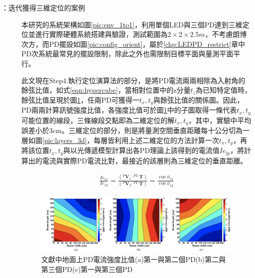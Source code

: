 \begin{description}




        \item[\cite{case:3d_layers}：迭代獲得三維定位的案例] \hfill 
        
        \qquad
        本研究的系統架構如圖\ref{pic:env_1to1}，利用單個LED與三個PD達到三維定位並進行實際硬體系統搭建與驗證，測試範圍為$2\times 2\times 2.5m$，不考慮朗博次方，而PD擺設如圖\ref{pic:config_orient}，屬於\ref{chp:LEDPD_restrict}章中PD次系統最常見的擺設限制，除此之外也需限制目標平面與量測平面平行。
        
        \qquad
        此文現在Step4.執行定位演算法的部分，是將PD電流兩兩相除為入射角的餘弦比值，如式\ref{eqn:hypercube}，當相對位置中的z分量$t_z$為已知特定值時，餘弦比值呈現於圖\ref{pic:layers_2d}，任兩PD可獲得一$t_x,t_y$與餘弦比值的關係圖。因此，PD兩兩計算訊號強度比值，各強度比值可於圖\ref{pic:layers_2d}中的子圖取得一條代表$t_x,t_y$可能位置的線段，三條線段交點即為二維定位的解$t_x,t_y$，其中，實驗中平均誤差小於3cm。三維定位的部分，則是將量測空間垂直距離每十公分切為一層如圖\ref{pic:layers_3d}，每層皆利用上述二維定位的方法計算一次$t_x,t_y$，再將該位置$t_x,t_y$與以光傳遞模型計算出各PD理論上該得到的電流值$Ie_{lp}$，將計算出的電流與實際PD電流比對，最接近的該層則為三維定位的垂直距離。

        \begin{equation}
            \label{eqn:hypercube}
            \begin{aligned}
                    \frac{Ie_{11}}{Ie_{12}}= 
                \frac{
                    ( ^{P}\boldsymbol{V}_1 \cdot 
                    ^{PL}\boldsymbol{T}
                    )
                } 
                    {
                        ( ^{P}\boldsymbol{V}_2 \cdot 
                                ^{PL}\boldsymbol{T}
                        )
                    }=\frac{\cos\phi_{11}}{\cos\phi_{12}}
            \end{aligned}
        \end{equation}

        \begin{figure}[htpb]
            \centering
            \includegraphics[width=15cm]{ch2pic/layers_2d.png}
            \caption{文獻\cite{case:3d_layers}中地面上PD電流強度比值(a)第一與第二個PD(b)第二與第三個PD(c)第一與第三個PD}
            \label{pic:layers_2d}
        \end{figure}


\end{description}
